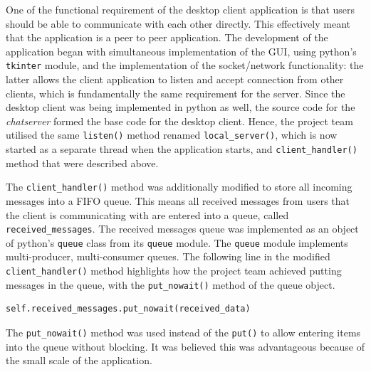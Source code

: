 \documentclass[finalReport.tex]{subfiles}
\begin{document}
One of the functional requirement of the desktop client application is that users should be able to communicate with each other directly. This effectively meant that the application is a peer to peer application. The development of the application began with simultaneous implementation of the GUI, using python's \lstinline'tkinter' module, and the implementation of the socket/network functionality: the latter allows the client application to listen and accept connection from other clients, which is fundamentally the same requirement for the server. Since the desktop client was being implemented in python as well, the source code for the \textit{chatserver} formed the base code for the desktop client. Hence, the project team utilised the same \lstinline'listen()' method renamed \lstinline'local_server()', which is now started as a separate thread when the application starts, and \lstinline'client_handler()' method that were  described above.

The \lstinline'client_handler()' method was additionally modified to store all incoming messages into a FIFO queue. This means all received messages from users that the client is communicating with are entered into a queue, called \lstinline'received_messages'. The received messages queue was implemented as an object of python's \lstinline'queue' class from its \lstinline'queue' module. The \lstinline'queue' module implements multi-producer, multi-consumer queues. The following line in the modified \lstinline'client_handler()' method highlights how the project team achieved putting messages in the queue, with the \lstinline'put_nowait()' method of the queue object.

\begin{lstlisting}
self.received_messages.put_nowait(received_data)
\end{lstlisting}

The \lstinline'put_nowait()' method was used instead of the \lstinline'put()' to allow entering items into the queue without blocking. It was believed this was advantageous because of the small scale of the application.
\end{document}
